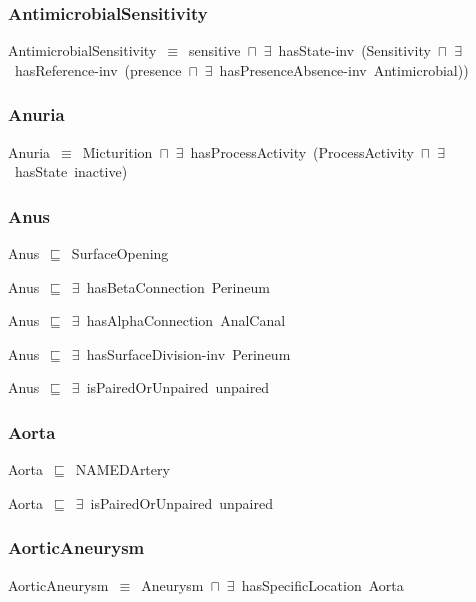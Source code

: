 \documentclass{article}
\begin{document}
\subsubsection*{AntimicrobialSensitivity}

AntimicrobialSensitivity~\ensuremath{\equiv}~sensitive~\ensuremath{\sqcap}~\ensuremath{\exists}~hasState-inv~(Sensitivity~\ensuremath{\sqcap}~\ensuremath{\exists}~hasReference-inv~(presence~\ensuremath{\sqcap}~\ensuremath{\exists}~hasPresenceAbsence-inv~Antimicrobial))

\subsubsection*{Anuria}

Anuria~\ensuremath{\equiv}~Micturition~\ensuremath{\sqcap}~\ensuremath{\exists}~hasProcessActivity~(ProcessActivity~\ensuremath{\sqcap}~\ensuremath{\exists}~hasState~inactive)

\subsubsection*{Anus}

Anus~\ensuremath{\sqsubseteq}~SurfaceOpening~

Anus~\ensuremath{\sqsubseteq}~\ensuremath{\exists}~hasBetaConnection~Perineum~

Anus~\ensuremath{\sqsubseteq}~\ensuremath{\exists}~hasAlphaConnection~AnalCanal~

Anus~\ensuremath{\sqsubseteq}~\ensuremath{\exists}~hasSurfaceDivision-inv~Perineum~

Anus~\ensuremath{\sqsubseteq}~\ensuremath{\exists}~isPairedOrUnpaired~unpaired~

\subsubsection*{Aorta}

Aorta~\ensuremath{\sqsubseteq}~NAMEDArtery~

Aorta~\ensuremath{\sqsubseteq}~\ensuremath{\exists}~isPairedOrUnpaired~unpaired~

\subsubsection*{AorticAneurysm}

AorticAneurysm~\ensuremath{\equiv}~Aneurysm~\ensuremath{\sqcap}~\ensuremath{\exists}~hasSpecificLocation~Aorta
\end{document}
